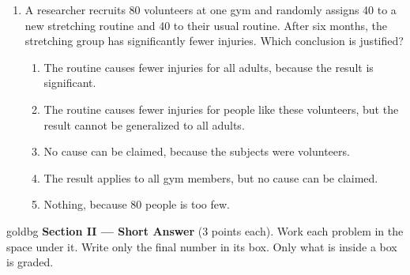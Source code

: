 \documentclass[12pt]{article}
\begin{document}
\begin{enumerate}[leftmargin=1.9em, itemsep=0.13in]
  \boxguard[13]
  \item A researcher recruits 80 volunteers at one gym and randomly assigns 40 to a new
        stretching routine and 40 to their usual routine. After six months, the stretching
        group has significantly fewer injuries. Which conclusion is justified?
        \begin{enumerate}[label=\textbf{(\Alph*)}, leftmargin=2.2em, itemsep=2pt]
          \item The routine causes fewer injuries for all adults, because the result is
                significant.
          \item The routine causes fewer injuries for people like these volunteers, but the
                result cannot be generalized to all adults.
          \item No cause can be claimed, because the subjects were volunteers.
          \item The result applies to all gym members, but no cause can be claimed.
          \item Nothing, because 80 people is too few.\hfill{}\rule[-0.2in]{0pt}{0.48in}
        \end{enumerate}

\end{enumerate}

\vspace{0.14in}

\boxguard[22]
\begin{headlinebox}{goldbg}
\small
\textbf{Section II --- Short Answer} (3 points each). Work each problem in the space under it.
Write only the final number in its box. Only what is inside a box is graded.
\end{headlinebox}

\vspace{0.10in}
\end{document}
